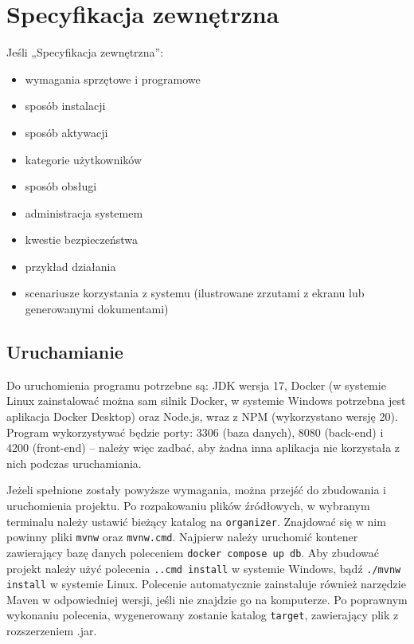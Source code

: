 \documentclass[a4paper,twoside,12pt]{book}
\begin{document}
\chapter{Specyfikacja zewnętrzna}
\label{ch:04}

Jeśli „Specyfikacja zewnętrzna”:
\begin{itemize}
\item  wymagania sprzętowe i programowe
\item  sposób instalacji
\item  sposób aktywacji
\item  kategorie użytkowników
\item  sposób obsługi
\item  administracja systemem
\item  kwestie bezpieczeństwa
\item  przykład działania
\item  scenariusze korzystania z systemu (ilustrowane zrzutami z ekranu lub generowanymi dokumentami)
\end{itemize}

\section{Uruchamianie}
Do uruchomienia programu potrzebne są: JDK wersja 17, Docker (w systemie Linux zainstalować można sam silnik Docker, w systemie Windows potrzebna jest aplikacja Docker Desktop) oraz Node.js, wraz z NPM (wykorzystano wersję 20). Program wykorzystywać będzie porty: 3306 (baza danych), 8080 (back-end) i 4200 (front-end) -- należy więc zadbać, aby żadna inna aplikacja nie korzystała z nich podczas uruchamiania.

Jeżeli spełnione zostały powyższe wymagania, można przejść do zbudowania i uruchomienia projektu. Po rozpakowaniu plików źródłowych, w wybranym terminalu należy ustawić bieżący katalog na \texttt{organizer}. Znajdować się w nim powinny pliki \texttt{mvnw} oraz \texttt{mvnw.cmd}. Najpierw należy uruchomić kontener zawierający bazę danych poleceniem \texttt{docker compose up db}. Aby zbudować projekt należy użyć polecenia \texttt{.\mvnw.cmd install} w systemie Windows, bądź \texttt{./mvnw install} w systemie Linux. Polecenie automatycznie zainstaluje również narzędzie Maven w odpowiedniej wersji, jeśli nie znajdzie go na komputerze. Po poprawnym wykonaniu polecenia, wygenerowany zostanie katalog \texttt{target}, zawierający plik z rozszerzeniem .jar.
\end{document}

